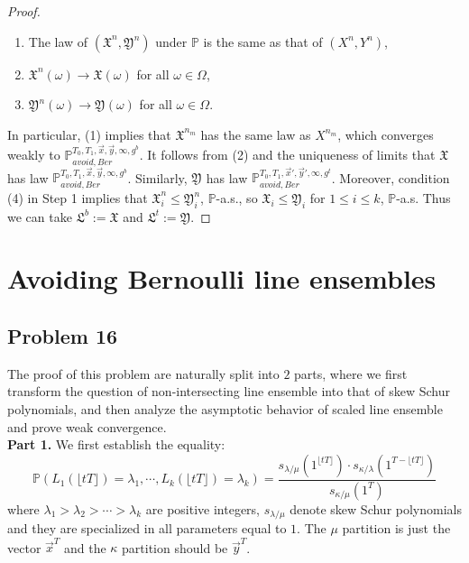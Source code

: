 \documentclass[12pt]{article}
\begin{document}
\begin{proof}
\begin{enumerate}[label=(\arabic*)]
		\item The law of $(\mathfrak{X}^n,\mathfrak{Y}^n)$ under $\mathbb{P}$ is the same as that of $(X^n,Y^n)$,
		
		\item $\mathfrak{X}^n(\omega) \longrightarrow \mathfrak{X}(\omega)$ for all $\omega\in\Omega$,
		
		\item $\mathfrak{Y}^n(\omega) \longrightarrow \mathfrak{Y}(\omega)$ for all $\omega\in\Omega$.
		
	\end{enumerate}

	In particular, (1) implies that $\mathfrak{X}^{n_m}$ has the same law as $X^{n_m}$, which converges weakly to $\mathbb{P}_{avoid,Ber}^{T_0,T_1,\vec{x},\vec{y},\infty,g^b}$. It follows from (2) and the uniqueness of limits that $\mathfrak{X}$ has law $\mathbb{P}_{avoid,Ber}^{T_0,T_1,\vec{x},\vec{y},\infty,g^b}$. Similarly, $\mathfrak{Y}$ has law $\mathbb{P}_{avoid,Ber}^{T_0,T_1,\vec{x}',\vec{y}',\infty,g^t}$. Moreover, condition (4) in Step 1 implies that $\mathfrak{X}^n_i \leq \mathfrak{Y}^n_i$, $\mathbb{P}$-a.s., so $\mathfrak{X}_i \leq \mathfrak{Y}_i$ for $1\leq i\leq k$, $\mathbb{P}$-a.s. Thus we can take $\mathfrak{L}^b := \mathfrak{X}$ and $\mathfrak{L}^t := \mathfrak{Y}$.
	
	\end{proof}


\section{Avoiding Bernoulli line ensembles}

								\subsection*{Problem 16}
The proof of this problem are naturally split into $2$ parts, where we first transform the question of non-intersecting line ensemble into that of skew Schur polynomials, and then analyze the asymptotic behavior of scaled line ensemble and prove weak convergence.\\
\textbf{Part 1. }We first establish the equality:
$$\mathbb{P}(L_{1}(\lfloor tT \rfloor) = \lambda_{1}, \cdots, L_{k}(\lfloor tT \rfloor) = \lambda_{k})=\frac{s_{\lambda/\mu}(1^{\lfloor tT \rfloor})\cdot s_{\kappa/\lambda}(1^{T-\lfloor tT \rfloor})}{s_{\kappa/\mu}(1^{T})}$$ where $\lambda_{1}>\lambda_{2}>\cdots >\lambda_{k}$ are positive integers, $s_{\lambda/\mu}$ denote skew Schur polynomials and they are specialized in all parameters equal to $1$. The $\mu$ partition is just the vector $\vec{x}^{T}$ and the $\kappa$ partition should be $\vec{y}^{T}$.
\end{document}
